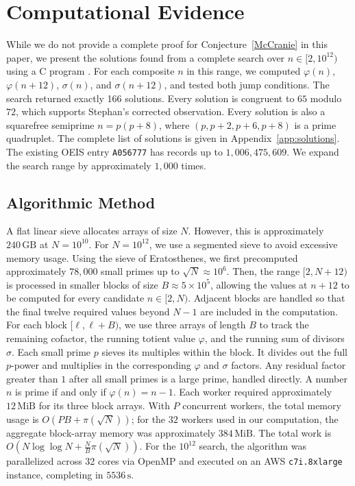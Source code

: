 \documentclass[12pt, twoside]{amsart}
\theoremstyle{definition}
\newcommand{\Cpp}{{C\nolinebreak[4]\hspace{-.05em}\raisebox{.4ex}{\tiny\bf ++}}}
\begin{document}
\section{Computational Evidence}\label{sec:empirical}

While we do not provide a complete proof for Conjecture~\ref{McCranie} in this paper, we present the solutions found from a complete search over $n \in [2, 10^{12})$ using a \Cpp{} program \cite{IntegerSequenceTesting}. For each composite $n$ in this range, we computed $\varphi(n)$, $\varphi(n+12)$, $\sigma(n)$, and $\sigma(n+12)$, and tested both jump conditions. The search returned exactly 166 solutions. Every solution is congruent to $65$ modulo $72$, which supports Stephan's corrected observation. Every solution is also a squarefree semiprime $n=p(p+8)$, where $(p,p+2,p+6,p+8)$ is a prime quadruplet. The complete list of solutions is given in Appendix~\ref{app:solutions}. The existing OEIS entry \texttt{A056777} \cite{OEIS-A056777} has records up to $1{,}006{,}475{,}609$. We expand the search range by approximately $1{,}000$ times.

\subsection*{Algorithmic Method}

A flat linear sieve allocates arrays of size $N$. However, this is approximately $240\,\mathrm{GB}$ at $N = 10^{10}$. For $N = 10^{12}$, we use a segmented sieve to avoid excessive memory usage. Using the sieve of Eratosthenes, we first precomputed approximately $78{,}000$ small primes up to $\sqrt{N} \approx 10^6$. Then, the range $[2,N+12)$ is processed in smaller blocks of size $B\approx5\times10^5$, allowing the values at $n+12$ to be computed for every candidate $n\in[2,N)$. Adjacent blocks are handled so that the final twelve required values beyond $N-1$ are included in the computation. For each block $[\ell, \ell + B)$, we use three arrays of length $B$ to track the remaining cofactor, the running totient value $\varphi$, and the running sum of divisors $\sigma$. Each small prime $p$ sieves its multiples within the block. It divides out the full $p$-power and multiplies in the corresponding $\varphi$ and $\sigma$ factors. Any residual factor greater than $1$ after all small primes is a large prime, handled directly. A number $n$ is prime if and only if $\varphi(n) = n - 1$. Each worker required approximately $12\,\mathrm{MiB}$ for its three block arrays. With $P$ concurrent workers, the total memory usage is $O(PB+\pi(\sqrt{N}))$; for the $32$ workers used in our computation, the aggregate block-array memory was approximately $384\,\mathrm{MiB}$. The total work is $O\!\left(N\log\log N+\frac{N}{B}\pi(\sqrt{N})\right)$. For the $10^{12}$ search, the algorithm was parallelized across 32 cores via OpenMP and executed on an AWS \texttt{c7i.8xlarge} instance, completing in $5536\,\mathrm{s}$.
\end{document}
